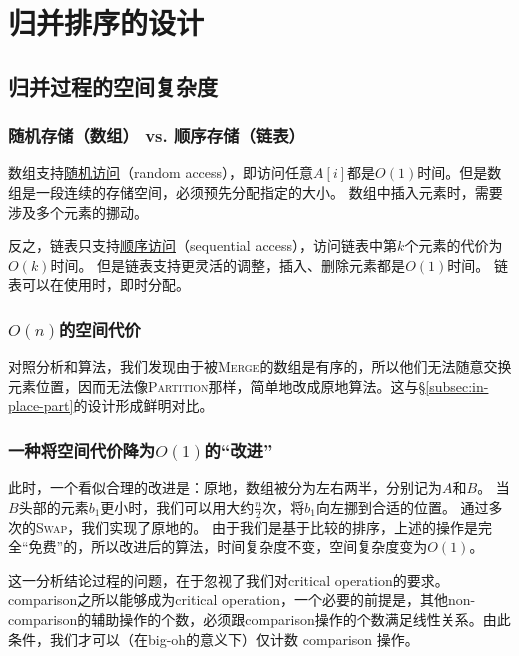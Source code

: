 \section{归并排序的设计}

\subsection{归并过程的空间复杂度}

\subsubsection{随机存储（数组） vs. 顺序存储（链表）}

数组支持\ul{随机访问}（random access），即访问任意$A[i]$都是$O(1)$时间。但是数组是一段连续的存储空间，必须预先分配指定的大小。
数组中插入元素时，需要涉及多个元素的挪动。

反之，链表只支持\ul{顺序访问}（sequential access），访问链表中第$k$个元素的代价为$O(k)$时间。
但是链表支持更灵活的调整，插入、删除元素都是$O(1)$时间。
链表可以在使用时，即时分配。

\subsubsection{$O(n)$的空间代价}

对照分析和算法，我们发现由于被\textsc{Merge}的数组是有序的，所以他们无法随意交换元素位置，因而无法像\textsc{Partition}那样，简单地改成原地算法。这与\S\ref{subsec:in-place-part}的设计形成鲜明对比。

\subsubsection{一种将空间代价降为$O(1)$的“改进”}

此时，一个看似合理的改进是：原地，数组被分为左右两半，分别记为$A$和$B$。
当$B$头部的元素$b_1$更小时，我们可以用大约$\frac{n}{2}$次，将$b_1$向左挪到合适的位置。
通过多次的\textsc{Swap}，我们实现了原地的。
由于我们是基于比较的排序，上述的操作是完全“免费”的，所以改进后的算法，时间复杂度不变，空间复杂度变为$O(1)$。

这一分析结论过程的问题，在于忽视了我们对critical operation的要求。comparison之所以能够成为critical operation，一个必要的前提是，其他non-comparison的辅助操作的个数，必须跟comparison操作的个数满足线性关系。由此条件，我们才可以（在big-oh的意义下）仅计数 comparison 操作。

